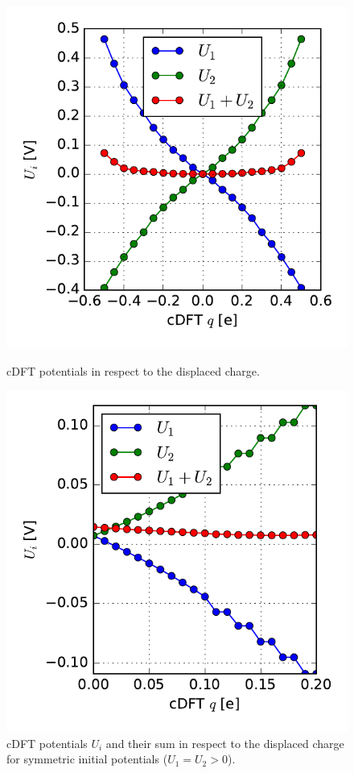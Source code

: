 \begin{figure}
	\centering
	\begin{minipage}{0.49\textwidth}
		\centering
			\includegraphics[width = \textwidth]{Images/Hydrogen/charging/potential_q_1}
			\caption{cDFT potentials in respect to the displaced charge.}
			\label{image_potentials_qs_1}
		\end{minipage}\hspace*{.5cm}
		\begin{minipage}{0.49\textwidth}
				\centering
				\includegraphics[width = \textwidth]{Images/Hydrogen/charging/Potential_asymmetry}
				\caption{cDFT potentials $U_i$ and their sum in respect to the displaced charge for symmetric initial potentials ($U_1 = U_2 > 0$).}
				\label{image_potential_asymmetrys}
	
		\end{minipage}
\end{figure}
